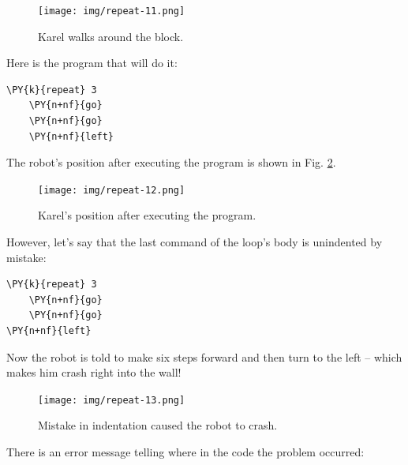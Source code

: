\begin{figure}[!ht]
\begin{center}
\texttt{[image: img/repeat-11.png]}
\vspace{-0mm}
\caption{Karel walks around the block.}
\label{fig:repeat-11}
\vspace{-0.6cm}
\end{center}
\end{figure}
\noindent
Here is the program that will do it:\\

\begin{bbox}
\begin{Verbatim}[commandchars=\\\{\}]
\PY{k}{repeat} 3
    \PY{n+nf}{go}
    \PY{n+nf}{go}
    \PY{n+nf}{left}
\end{Verbatim}
\end{bbox}
\vspace{6mm}

\noindent
The robot's position after executing the program is shown in Fig. \ref{fig:repeat-12}.
\vspace{-2mm}

\begin{figure}[!ht]
\begin{center}
\texttt{[image: img/repeat-12.png]}
\vspace{-0mm}
\caption{Karel's position after executing the program.}
\label{fig:repeat-12}
\vspace{-1cm}
\end{center}
\end{figure}
\newpage
\noindent
However, let's say that the last command of the loop's body is
unindented by mistake:\\

\begin{bbox}
\begin{Verbatim}[commandchars=\\\{\}]
\PY{k}{repeat} 3
    \PY{n+nf}{go}
    \PY{n+nf}{go}
\PY{n+nf}{left}
\end{Verbatim}
\end{bbox}
\vspace{6mm}

\noindent
Now the robot is told to make six steps forward and then turn to the left --
which makes him crash right into the wall!

\begin{figure}[!ht]
\begin{center}
\texttt{[image: img/repeat-13.png]}
\vspace{-0mm}
\caption{Mistake in indentation caused the robot to crash.}
\label{fig:repeat-13}
\end{center}
\end{figure}
\noindent
There is an error message telling where in the code the problem occurred:\\

